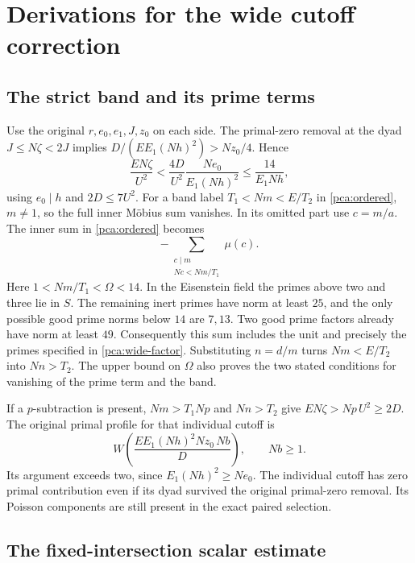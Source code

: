 \section{Derivations for the wide cutoff correction}
\label{pca:wide-details}

\subsection{The strict band and its prime terms}
\label{pca:wide-band-proof}

Use the original \(r,e_0,e_1,J,z_0\) on each side.
The primal-zero removal at the dyad \(J\le N\zeta<2J\)
implies \(D/(EE_1(Nh)^2)>Nz_0/4\). Hence
\[
 \frac{E N\zeta}{U^2}
 <\frac{4D}{U^2}\frac{Ne_0}{E_1(Nh)^2}
 \le\frac{14}{E_1Nh},
\]
using \(e_0\mid h\) and \(2D\le7U^2\).
For a band label \(T_1<Nm<E/T_2\) in
\eqref{pca:ordered}, \(m\ne1\), so the full inner
M\"obius sum vanishes. In its omitted part use \(c=m/a\).
The inner sum in \eqref{pca:ordered} becomes
\[
 -\sum_{\substack{c\mid m\\Nc<Nm/T_1}}\mu(c).
\]
Here \(1<Nm/T_1<\Omega<14\). In the Eisenstein field the
primes above two and three lie in \(S\). The remaining
inert primes have norm at least \(25\), and the only
possible good prime norms below \(14\) are \(7,13\).
Two good prime factors already have norm at least \(49\).
Consequently this sum includes the unit and precisely the
primes specified in \eqref{pca:wide-factor}.
Substituting \(n=d/m\) turns \(Nm<E/T_2\) into \(Nn>T_2\).
The upper bound on \(\Omega\) also proves the two stated
conditions for vanishing of the prime term and the band.

If a \(p\)-subtraction is present, \(Nm>T_1Np\) and
\(Nn>T_2\) give \(E N\zeta>Np\,U^2\ge2D\).
The original primal profile for that individual cutoff is
\[
 W\!\left(\frac{E E_1(Nh)^2Nz_0\,Nb}{D}\right),
 \qquad Nb\ge1 .
\]
Its argument exceeds two, since \(E_1(Nh)^2\ge Ne_0\).
The individual cutoff has zero primal contribution even
if its dyad survived the original primal-zero removal.
Its Poisson components are still present in the exact
paired selection.

\subsection{The fixed-intersection scalar estimate}
\label{pca:wide-scalar-proof}

